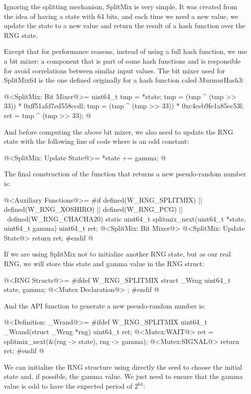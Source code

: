 Ignoring the splitting mechanism, SplitMix is very simple. It was
created from the idea of having a state with 64 bits, and each time we
need a new value, we update the state to a new value and return the
result of a hash function over the RNG state.

Except that for performance reasons, instead of using a full hash
function, we use a bit mixer: a component that is part of some hash
functions and is responsible for avoid correlations between similar
input values. The bit mixer used for SplitMix64 is the one defined
originally for a hash function caled MurmurHash3:

\iniciocodigo
@<SplitMix: Bit Mixer@>=
{
  uint64_t tmp = *state;
  tmp = (tmp ^ (tmp >> 33)) * 0xff51afd7ed558ccdl;
  tmp = (tmp ^ (tmp >> 33)) * 0xc4ceb9fe1a85ec53l;
  ret = tmp ^ (tmp >> 33);
} 
@
\fimcodigo

And before computing the above bit mixer, we also need to update the
RNG state with the following line of code where  is
an odd constant:

\iniciocodigo
@<SplitMix: Update State@>=
{
  *state +=  gamma;
} 
@
\fimcodigo

The final construction of the function that returns a new
pseudo-random number is:

\iniciocodigo
@<Auxiliary Functions@>=
#if defined(W_RNG_SPLITMIX) || defined(W_RNG_XOSHIRO) || defined(W_RNG_PCG) || \
  defined(W_RNG_CHACHA20)
static uint64_t splitmix_next(uint64_t *state, uint64_t gamma){
  uint64_t ret;
  @<SplitMix: Bit Mixer@>
  @<SplitMix: Update State@>
  return ret;
}
#endif
@
\fimcodigo

If we are using SplitMix not to initialize another RNG state, but as
our real RNG, we will store this state and gamma value in the RNG
struct:

\iniciocodigo
@<RNG Structs@>=
#ifdef W_RNG_SPLITMIX
struct _Wrng{
  uint64_t state, gamma;
  @<Mutex Declaration@>
};
#endif
@
\fimcodigo

And the API function to generate a new pseudo-random number is:

\iniciocodigo
@<Definition: \_Wrand@>=
#ifdef W_RNG_SPLITMIX
uint64_t _Wrand(struct _Wrng *rng){
  uint64_t ret;
  @<Mutex:WAIT@>
  ret = splitmix_next(&(rng -> state), rng -> gamma);
  @<Mutex:SIGNAL@>
  return ret;
}
#endif
@
\fimcodigo

We can initialize the RNG structure using directly the seed to choose
the initial state and, if possible, the gamma value. We just need to
ensure that the gamma value is odd to have the expected period of
$2^{64}$:

